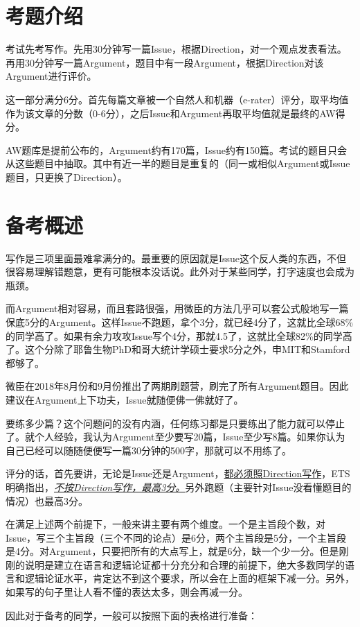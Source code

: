 \documentclass[cn,plain]{./src/qyxfbook}
\begin{document}
		\section{考题介绍}
			考试先考写作。先用30分钟写一篇Issue，根据Direction，对一个观点发表看法。再用30分钟写一篇Argument，题目中有一段Argument，根据Direction对该Argument进行评价。\par
			这一部分满分6分。首先每篇文章被一个自然人和机器（e-rater）评分，取平均值作为该文章的分数（0-6分），之后Issue和Argument再取平均值就是最终的AW得分。\par
			AW题库是提前公布的，Argument约有170篇，Issue约有150篇。考试的题目只会从这些题目中抽取。其中有近一半的题目是重复的（同一或相似Argument或Issue题目，只更换了Direction）。
		
	
		\section{备考概述}
			写作是三项里面最难拿满分的。最重要的原因就是Issue这个反人类的东西，不但很容易理解错题意，更有可能根本没话说。此外对于某些同学，打字速度也会成为瓶颈。\par
			而Argument相对容易，而且套路很强，用微臣的方法几乎可以套公式般地写一篇保底5分的Argument。这样Issue不跑题，拿个3分，就已经4分了，这就比全球68\%的同学高了。如果有余力攻攻Issue写个4分，那就4.5了，这就比全球82\%的同学高了。这个分除了耶鲁生物PhD和哥大统计学硕士要求5分之外，申MIT和Stamford都够了。\par
			微臣在2018年8月份和9月份推出了两期刷题营，刷完了所有Argument题目。因此建议在Argument上下功夫，Issue就随便佛一佛就好了。\par
			要练多少篇？这个问题问的没有内涵，任何练习都是只要练出了能力就可以停止了。就个人经验，我认为Argument至少要写20篇，Issue至少写8篇。如果你认为自己已经可以随随便便写一篇30分钟的500字，那就可以不用练了。\par
			
			评分的话，首先要讲，无论是Issue还是Argument，\underline{\Large 都必须照Direction写作}，ETS明确指出，\underline{\itshape \huge 不按Direction写作，最高3分。}另外跑题（主要针对Issue没看懂题目的情况）也最高3分。\par
			在满足上述两个前提下，一般来讲主要有两个维度。一个是主旨段个数，对Issue，写三个主旨段（三个不同的论点）是6分，两个主旨段是5分，一个主旨段是4分。对Argument，只要把所有的大点写上，就是6分，缺一个少一分。但是刚刚的说明是建立在语言和逻辑论证都十分充分和合理的前提下，绝大多数同学的语言和逻辑论证水平，肯定达不到这个要求，所以会在上面的框架下减一分。另外，如果写的句子里让人看不懂的表达太多，则会再减一分。\par
			因此对于备考的同学，一般可以按照下面的表格进行准备：\par
		
\end{document}
